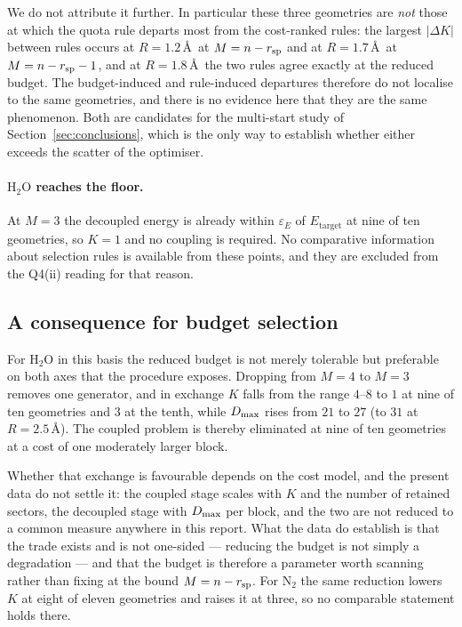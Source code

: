 We do not attribute it further. In particular these three geometries are
\emph{not} those at which the quota rule departs most from the cost-ranked
rules: the largest $|\Delta K|$ between rules occurs at $R=1.2$\,\AA\ at
$M=n-r_{\mathrm{sp}}$ and at $R=1.7$\,\AA\ at $M=n-r_{\mathrm{sp}}-1$, and at $R=1.8$\,\AA\ the two
rules agree exactly at the reduced budget. The budget-induced and rule-induced
departures therefore do not localise to the same geometries, and there is no
evidence here that they are the same phenomenon. Both are candidates for the
multi-start study of Section~\ref{sec:conclusions}, which is the only way to
establish whether either exceeds the scatter of the optimiser.

\paragraph{$\mathrm{H_2O}$ reaches the floor.}
At $M=3$ the decoupled energy is already within $\varepsilon_E$ of
$E_{\mathrm{target}}$ at nine of ten geometries, so $K=1$ and no coupling is
required. No comparative information about selection rules is available from
these points, and they are excluded from the Q4(ii) reading for that reason.

\subsection{A consequence for budget selection}

For $\mathrm{H_2O}$ in this basis the reduced budget is not merely tolerable but
preferable on both axes that the procedure exposes. Dropping from $M=4$ to
$M=3$ removes one generator, and in exchange $K$ falls from the range $4$--$8$
to $1$ at nine of ten geometries and $3$ at the tenth, while $D_{\max}$ rises from
$21$ to $27$ (to $31$ at $R=2.5$\,\AA). The coupled problem is thereby
eliminated at nine of ten geometries at a cost of one moderately larger block.

Whether that exchange is favourable depends on the cost model, and the present
data do not settle it: the coupled stage scales with $K$ and the number of
retained sectors, the decoupled stage with $D_{\max}$ per block, and the two are
not reduced to a common measure anywhere in this report. What the data do
establish is that the trade exists and is not one-sided --- reducing the budget
is not simply a degradation --- and that the budget is therefore a parameter
worth scanning rather than fixing at the bound $M=n-r_{\mathrm{sp}}$. For $\mathrm{N_2}$
the same reduction lowers $K$ at eight of eleven geometries and raises it at
three, so no comparable statement holds there.
